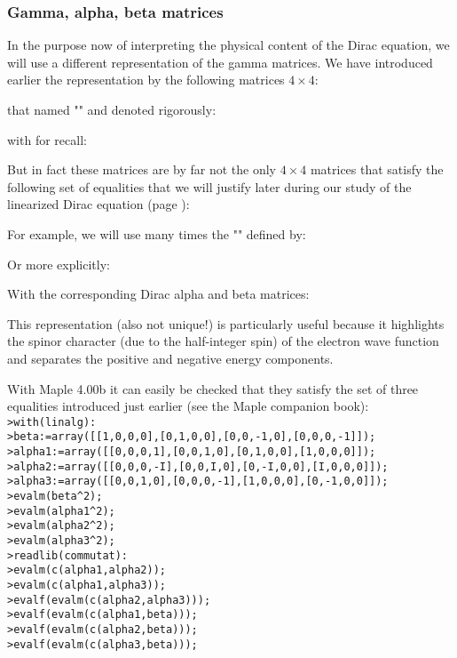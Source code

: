 	\subsubsection{Gamma, alpha, beta matrices}
	In the purpose now of interpreting the physical content of the Dirac equation, we will use a different representation of the gamma matrices. We have introduced earlier the representation by the following matrices $4\times 4$:
	
	that named "" and denoted rigorously:
	
	with for recall:
	
	But in fact these matrices are by far not the only $4\times 4$ matrices that satisfy the following set of equalities that we will justify later during our study of the linearized Dirac equation (page \pageref{linearized dirac equation}):
	
	For example, we will use many times the "" defined by:
	
	Or more explicitly:
	
	With the corresponding Dirac alpha and beta matrices:
	
	This representation (also not unique!) is particularly useful because it highlights the spinor character (due to the half-integer spin) of the electron wave function and separates the positive and negative energy components.
	
	With Maple 4.00b it can easily be checked that they satisfy the set of three equalities introduced just earlier (see the Maple companion book):\\
	
	\texttt{>with(linalg):\\
	>beta:=array([[1,0,0,0],[0,1,0,0],[0,0,-1,0],[0,0,0,-1]]);\\
	>alpha1:=array([[0,0,0,1],[0,0,1,0],[0,1,0,0],[1,0,0,0]]);\\
	>alpha2:=array([[0,0,0,-I],[0,0,I,0],[0,-I,0,0],[I,0,0,0]]);\\
	>alpha3:=array([[0,0,1,0],[0,0,0,-1],[1,0,0,0],[0,-1,0,0]]);\\
	>evalm(beta\string^2);\\
	>evalm(alpha1\string^2);\\
	>evalm(alpha2\string^2);\\
	>evalm(alpha3\string^2);\\
	>readlib(commutat):\\
	>evalm(c(alpha1,alpha2));\\
	>evalm(c(alpha1,alpha3));\\
	>evalf(evalm(c(alpha2,alpha3)));\\
	>evalf(evalm(c(alpha1,beta)));\\
	>evalf(evalm(c(alpha2,beta)));\\
	>evalf(evalm(c(alpha3,beta)));\\
	}
	
